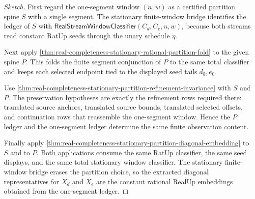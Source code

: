 \begin{proof}[Sketch]
First regard the one-segment window $(n,w)$ as a certified partition spine
$S$ with a single segment. The stationary finite-window bridge identifies the
ledger of $S$ with
$\mathsf{RealStreamWindowClassifier}(C_d,C_e,n,w)$, because both streams read
constant RatUp seeds through the unary schedule $\eta$.

Next apply
\autoref{thm:real-completeness-stationary-rational-partition-fold} to the
given spine $P$. This folds the finite segment conjunction of $P$ to the same
total classifier and keeps each selected endpoint tied to the displayed seed
tails $d_0,e_0$.

Use
\autoref{thm:real-completeness-stationary-partition-refinement-invariance}
with $S$ and $P$. The preservation hypotheses are exactly the refinement rows
required there: translated source anchors, translated source bounds,
translated selected offsets, and continuation rows that reassemble the
one-segment window. Hence the $P$ ledger and the one-segment ledger determine
the same finite observation content.

Finally apply
\autoref{thm:real-completeness-stationary-partition-diagonal-embedding} to
$S$ and to $P$. Both applications consume the same RatUp classifier, the same
seed displays, and the same total stationary window classifier. The stationary
finite-window bridge erases the partition choice, so the extracted diagonal
representatives for $X_d$ and $X_e$ are the constant rational RealUp
embeddings obtained from the one-segment ledger.
\end{proof}
